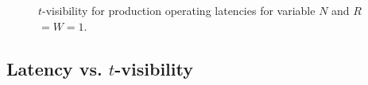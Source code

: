 \documentclass{vldb}
\newcommand{\subsectionskip}{-0em}
\begin{document}
\begin{figure}
\centering
{}
\vspace{-14pt}
\caption{$t$-visibility for production operating latencies for variable $N$ and $R$$=$$W$$=$$1$.}
\vspace{-2pt}
\label{fig:varyn}
\end{figure}

\vspace{\subsectionskip}\subsection{Latency vs. $t$-visibility}
\end{document}
